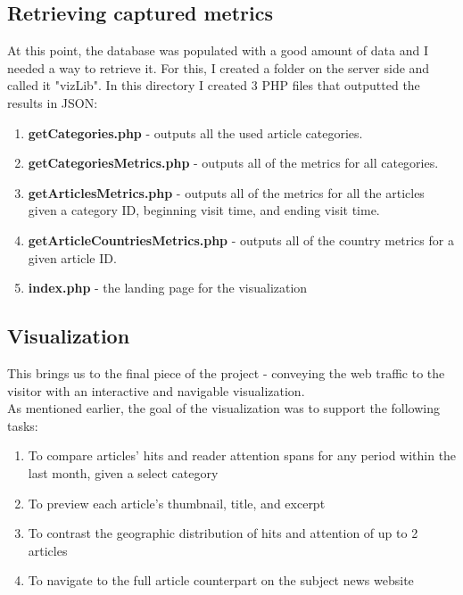 \documentclass[12pt]{article}
\begin{document}
{\newpage

\subsection{Retrieving captured metrics}
At this point, the database was populated with a good amount of data and I needed a way to retrieve it. For this, I created a folder on the server side and called it "vizLib". In this directory I created 3 PHP files that outputted the results in JSON:
\begin{enumerate}
\item{\textbf{getCategories.php} - outputs all the used article categories.}

\item{\textbf{getCategoriesMetrics.php} - outputs all of the metrics for all categories.}

\item{\textbf{getArticlesMetrics.php} - outputs all of the metrics for all the articles given a category ID, beginning visit time, and ending visit time.}

\item{\textbf{getArticleCountriesMetrics.php} - outputs all of the country metrics for a given article ID.}

\item{\textbf{index.php} - the landing page for the visualization}

\end{enumerate}

\newpage

\subsection{Visualization}

This brings us to the final piece of the project - conveying the web traffic to the visitor with an interactive and navigable visualization. \\ As mentioned earlier, the goal of the visualization was to support the following tasks:
\begin{enumerate}
\item To compare articles' hits and reader attention spans for any period within the last month, given a select category
\item To preview each article's thumbnail, title, and excerpt
\item To contrast the geographic distribution of hits and attention of up to 2 articles
\item To navigate to the full article counterpart on the subject news website
\end{enumerate}

}
\end{document}
